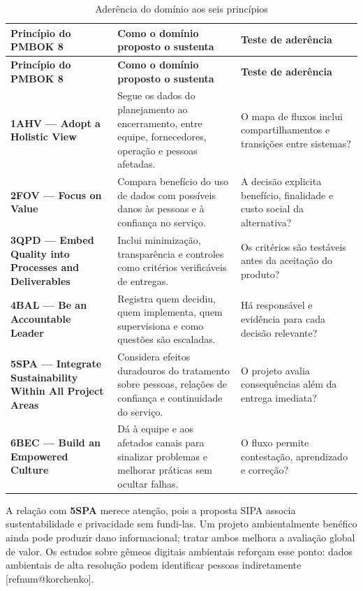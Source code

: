 \documentclass[11pt,a4paper]{article}
\makeatletter
\newcommand{\refnum}[1]{\csname refnum@#1\endcsname}
\newcommand{\cit}[1]{[\refnum{#1}]}
\newcommand{\SingleSpacing}{}
\newcommand{\fontetab}[1]{\par\vspace{3pt}{\small\noindent Fonte: #1\par}}
\makeatother
\begin{document}
\begingroup\SingleSpacing\small
\begin{longtable}{@{}>{\raggedright\arraybackslash}p{}>{\raggedright\arraybackslash}p{}>{\raggedright\arraybackslash}p{}@{}}
\caption{Aderência do domínio aos seis princípios}\label{tab:t9}\\
\toprule
\textbf{Princípio do PMBOK 8} & \textbf{Como o domínio proposto o sustenta} & \textbf{Teste de aderência}\\
\midrule
\endfirsthead
\toprule
\textbf{Princípio do PMBOK 8} & \textbf{Como o domínio proposto o sustenta} & \textbf{Teste de aderência}\\
\midrule
\endhead
\bottomrule
\endfoot
\bottomrule
\endlastfoot
\textbf{1AHV — Adopt a Holistic View} & Segue os dados do planejamento ao encerramento, entre equipe, fornecedores, operação e pessoas afetadas. & O mapa de fluxos inclui compartilhamentos e transições entre sistemas?\\[3pt]
\textbf{2FOV — Focus on Value} & Compara benefício do uso de dados com possíveis danos às pessoas e à confiança no serviço. & A decisão explicita benefício, finalidade e custo social da alternativa?\\[3pt]
\textbf{3QPD — Embed Quality into Processes and Deliverables} & Inclui minimização, transparência e controles como critérios verificáveis de entregas. & Os critérios são testáveis antes da aceitação do produto?\\[3pt]
\textbf{4BAL — Be an Accountable Leader} & Registra quem decidiu, quem implementa, quem supervisiona e como questões são escaladas. & Há responsável e evidência para cada decisão relevante?\\[3pt]
\textbf{5SPA — Integrate Sustainability Within All Project Areas} & Considera efeitos duradouros do tratamento sobre pessoas, relações de confiança e continuidade do serviço. & O projeto avalia consequências além da entrega imediata?\\[3pt]
\textbf{6BEC — Build an Empowered Culture} & Dá à equipe e aos afetados canais para sinalizar problemas e melhorar práticas sem ocultar falhas. & O fluxo permite contestação, aprendizado e correção?\\[3pt]
\end{longtable}
\endgroup
\fontetab{Elaborado pelos autores (2026), com base em \cit{pmi}.}

A relação com \textbf{5SPA} merece atenção, pois a proposta SIPA associa sustentabilidade e privacidade sem fundi-las. Um projeto ambientalmente benéfico ainda pode produzir dano informacional; tratar ambos melhora a avaliação global de valor. Os estudos sobre gêmeos digitais ambientais reforçam esse ponto: dados ambientais de alta resolução podem identificar pessoas indiretamente [\refnum{korchenko}].
\end{document}

